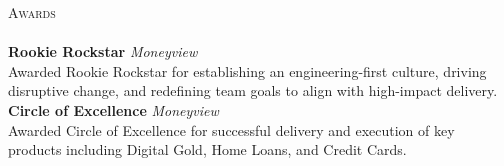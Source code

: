 \documentclass[a4paper]{article}
\newcommand{\lineunder} {
    \vspace*{-8pt} \\
    \hspace*{-18pt} \hrulefill \\
}
\newcommand{\header} [1] {
    {\hspace*{-18pt}\vspace*{6pt} \textsc{#1}}
    \vspace*{-6pt} \lineunder
}
\begin{document}
\header{Awards}
{\textbf{Rookie Rockstar}} {\sl Moneyview} \\
Awarded \textquotesingle{}Rookie Rockstar\textquotesingle{} for establishing an engineering-first culture, driving disruptive change, and redefining team goals to align with high-impact delivery.\\
\vspace*{2mm}
{\textbf{Circle of Excellence}} {\sl Moneyview} \\
Awarded \textquotesingle{}Circle of Excellence\textquotesingle{} for successful delivery and execution of key products including Digital Gold, Home Loans, and Credit Cards.\\
\vspace*{2mm}

\ 
\end{document}
